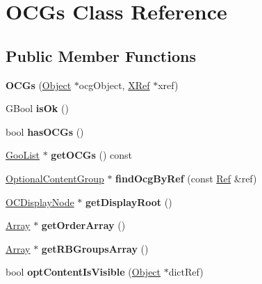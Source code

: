 \hypertarget{class_o_c_gs}{}\section{O\+C\+Gs Class Reference}
\label{class_o_c_gs}
\subsection*{Public Member Functions}
\begin{DoxyCompactItemize}
\item 
\mbox{\label{class_o_c_gs_a7a2718b7ebee1a14144f6b83595e5059}} 
{\bfseries O\+C\+Gs} (\hyperlink{class_object}{Object} $\ast$ocg\+Object, \hyperlink{class_x_ref}{X\+Ref} $\ast$xref)
\item 
\mbox{\label{class_o_c_gs_a66b86a4952a4ffa5780c70b0fb177b70}} 
G\+Bool {\bfseries is\+Ok} ()
\item 
\mbox{\label{class_o_c_gs_ae78d221f4be1f898e99416188757da7b}} 
bool {\bfseries has\+O\+C\+Gs} ()
\item 
\mbox{\label{class_o_c_gs_a880a61d165b7343bdb5725d851024bd9}} 
\hyperlink{class_goo_list}{Goo\+List} $\ast$ {\bfseries get\+O\+C\+Gs} () const
\item 
\mbox{\label{class_o_c_gs_a99916a3905312557d2b6731b0bee8300}} 
\hyperlink{class_optional_content_group}{Optional\+Content\+Group} $\ast$ {\bfseries find\+Ocg\+By\+Ref} (const \hyperlink{struct_ref}{Ref} \&ref)
\item 
\mbox{\label{class_o_c_gs_af4ababfcdf9b0dd56dbcf0acb7f1e801}} 
\hyperlink{class_o_c_display_node}{O\+C\+Display\+Node} $\ast$ {\bfseries get\+Display\+Root} ()
\item 
\mbox{\label{class_o_c_gs_abe7443b1dcb1da9aa501d57d0d9ca9e9}} 
\hyperlink{class_array}{Array} $\ast$ {\bfseries get\+Order\+Array} ()
\item 
\mbox{\label{class_o_c_gs_a992a37c2bf841681ade9a4d24e35e6e5}} 
\hyperlink{class_array}{Array} $\ast$ {\bfseries get\+R\+B\+Groups\+Array} ()
\item 
\mbox{\label{class_o_c_gs_a4ff3f096b8a45d50387f4e6cbde052ed}} 
bool {\bfseries opt\+Content\+Is\+Visible} (\hyperlink{class_object}{Object} $\ast$dict\+Ref)
\end{DoxyCompactItemize}


